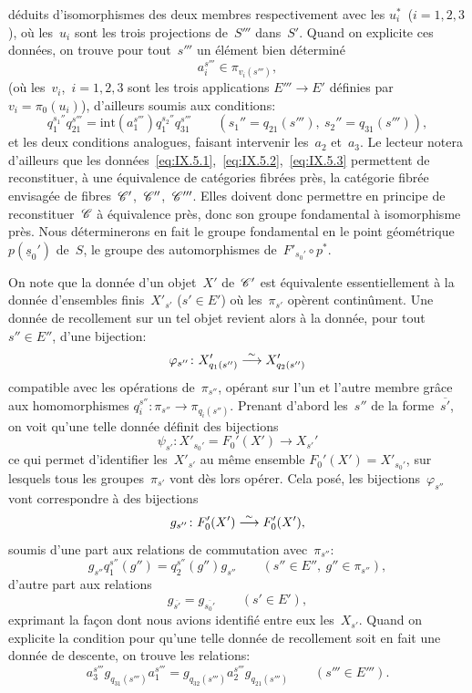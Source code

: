 d\'eduits d'isomorphismes des deux membres respectivement avec les
$u_i^*$~($i=1,2,3$), o\`u les~$u_i$ sont les trois projections
de~$S'''$ dans~$S'$. Quand on explicite ces donn\'ees, on trouve
pour tout~$s'''$ un \'el\'ement bien d\'etermin\'e
\begin{equation*}
\label{eq:IX.5.3}
\tag{3} {a_i^{s'''}\in\pi_{v_i(s''')},}
\end{equation*}
(o\`u les~$v_i$,~$i=1,2,3$ sont les trois applications $E'''\to E'$
d\'efinies par $v_i=\pi_0(u_i)$), d'ailleurs soumis aux conditions:
$$
q_1^{s_1''}q_{21}^{s'''}=\mathrm{int}(a_1^{s'''})
q_1^{s_2''}q_{31}^{s'''}\qquad (s_1''=q_{21}(s'''),\
s_2''=q_{31}(s''')),
$$
et les deux conditions analogues, faisant intervenir les~$a_2$
et~$a_3$. Le lecteur notera d'ailleurs que les
donn\'ees~\eqref{eq:IX.5.1},~\eqref{eq:IX.5.2},~\eqref{eq:IX.5.3}
permettent de reconstituer, \`a une \'equivalence de
cat\'egories fibr\'ees pr\`es, la cat\'egorie fibr\'ee
envisag\'ee de fibres~$\cal{C}'$,~$\cal{C}''$,~$\cal{C}'''$. Elles
doivent donc permettre en principe de reconstituer~$\cal{C}$ \`a
\'equivalence pr\`es, donc son groupe fondamental \`a
isomorphisme pr\`es. Nous d\'eterminerons en fait le groupe
fondamental en le point g\'eom\'etrique $p(\underline{s}_0')$
de~$S$, \ie le groupe des automorphismes de~$F'_{s_0'}\circ p^*$.

On note que la donn\'ee d'un objet~$X'$ de~$\cal{C}'$ est
\'equivalente essentiellement \`a la donn\'ee d'ensembles
finis~$X'_{s'}$ ($s'\in E'$) o\`u les~$\pi_{s'}$ op\`erent
contin\^ument. Une
donn\'ee de recollement sur un tel objet revient alors \`a la
donn\'ee, pour tout $s''\in E''$, d'une bijection:
$$
\varphi_{s''}\colon X'_{q_1(s'')}\overset{\sim}{\longrightarrow} X'_{q_2(s'')}
$$
compatible avec les op\'erations de~$\pi_{s''}$, op\'erant sur
l'un et l'autre membre gr\^ace aux homomorphismes $q_i^{s''}\colon
\pi_{s''}\to\pi_{q_i(s'')}$. Prenant d'abord les~$s''$ de la
forme~$\overline{s'}$, on voit qu'une telle donn\'ee d\'efinit des
bijections
$$
\psi_{s'}\colon X'_{s_0'}=F_0'(X')\to X_{s'}'
$$
ce qui permet d'identifier les~$X'_{s'}$ au m\^eme ensemble
$F_0'(X')=X'_{s_0'}$, sur lesquels tous les groupes~$\pi_{s'}$ vont
d\`es lors op\'erer. Cela pos\'e, les
bijections~$\varphi_{s''}$ vont correspondre \`a des bijections
$$
g_{s''}\colon F_0'(X')\overset{\sim}{\longrightarrow} F_0'(X'),
$$
soumis d'une part aux relations de commutation avec~$\pi_{s''}$:
\begin{equation*}
\label{eq:IX.5.a}
\tag*{a)} {g_{s''}q_1^{s''}(g'')=q_2^{s''}(g'')g_{s''}\qquad (s''\in E'',\ g''\in\pi_{s''}),}
\end{equation*}
d'autre part aux relations
\begin{equation*}
\label{eq:IX.5.b}
\tag*{b)} {g_{\overline{s'}}=g_{\overline{s_0'}}\qquad (s'\in E'),}
\end{equation*}
exprimant la fa\c con dont nous avions identifi\'e entre eux
les~$X_{s'}$. Quand on explicite la condition pour qu'une telle
donn\'ee de recollement soit en fait une donn\'ee de descente, on
trouve les relations:
\begin{equation*}
\label{eq:IX.5.c}
\tag*{c)} {a_3^{s'''}g_{q_{31}(s''')}a_1^{s'''}=
g_{q_{32}(s''')}a_2^{s'''}g_{q_{21}(s''')}\qquad (s'''\in E''').}
\end{equation*}

